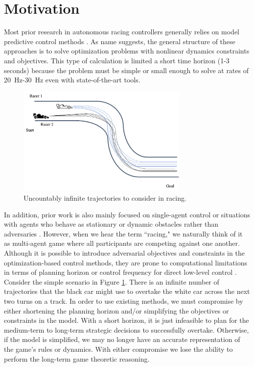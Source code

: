 \section{Motivation} %
Most prior research in autonomous racing controllers generally relies on model predictive control methods \cite{Liniger2014, Anderson2016, Kalaria2021, Kloeser2020,OKelly2020, Vazquez2020}. As name suggests, the general structure of these approaches is to solve optimization problems with nonlinear dynamics constraints and objectives. This type of calculation is limited a short time horizon (1-3 seconds) because the problem must be simple or small enough to solve at rates of \SI{20}{\hertz}-\SI{30}{\hertz} even with state-of-the-art tools. 

\begin{figure}
\begin{center}
   \includegraphics[width=0.75\textwidth]{Figures/MotivatingExampleInfTraj.png}
\caption{Uncountably infinite trajectories to consider in racing.}
\label{fig:motivating_example:inf}
\end{center}
\end{figure}

In addition, prior work is also mainly focused on single-agent control or situations with agents who behave as stationary or dynamic obstacles rather than adversaries \cite{Liniger2014, Anderson2016, Kalaria2021, Kloeser2020,OKelly2020, Vazquez2020, He2021, Hou2016, Stahl2019_2}. However, when we hear the term ``racing," we naturally think of it as multi-agent game where all participants are competing against one another. Although it is possible to introduce adversarial objectives and constraints in the optimization-based control methods, they are prone to computational limitations in terms of planning horizon or control frequency for direct low-level control \cite{Liniger2020, Li2021}. Consider the simple scenario in Figure \ref{fig:motivating_example:inf}. There is an infinite number of trajectories that the black car might use to overtake the white car across the next two turns on a track. In order to use existing methods, we must compromise by either shortening the planning horizon and/or simplifying the objectives or constraints in the model. With a short horizon, it is just infeasible to plan for the medium-term to long-term strategic decisions to successfully overtake. Otherwise, if the model is simplified, we may no longer have an accurate representation of the game's rules or dynamics. With either compromise we lose the ability to perform the long-term game theoretic reasoning.

